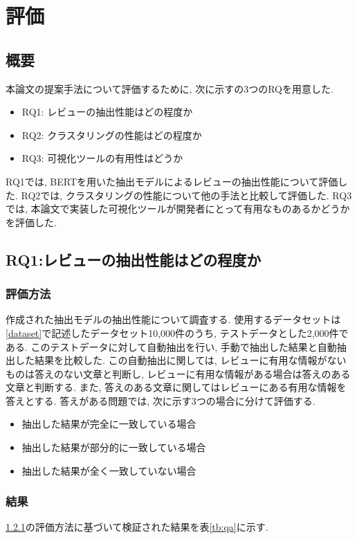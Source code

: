 \chapter{評価}
\label{chap:kekkahyouka}

\section{概要}
本論文の提案手法について評価するために, 次に示すの3つのRQを用意した. 

\begin{itemize}
  \item RQ1: レビューの抽出性能はどの程度か
  \item RQ2: クラスタリングの性能はどの程度か
  \item RQ3: 可視化ツールの有用性はどうか
\end{itemize}

RQ1では, BERTを用いた抽出モデルによるレビューの抽出性能について評価した. 
RQ2では, クラスタリングの性能について他の手法と比較して評価した. 
RQ3では, 本論文で実装した可視化ツールが開発者にとって有用なものあるかどうかを評価した. 

\section{RQ1:レビューの抽出性能はどの程度か}
\subsection{評価方法}\label{method}
作成された抽出モデルの抽出性能について調査する. 使用するデータセットは\ref{dataset}で記述したデータセット10,000件のうち, テストデータとした2,000件である. このテストデータに対して自動抽出を行い, 手動で抽出した結果と自動抽出した結果を比較した. 
この自動抽出に関しては, レビューに有用な情報がないものは答えのない文章と判断し, レビューに有用な情報がある場合は答えのある文章と判断する. また, 答えのある文章に関してはレビューにある有用な情報を答えとする. 
答えがある問題では, 次に示す3つの場合に分けて評価する. 

\begin{itemize}
  \item 抽出した結果が完全に一致している場合
  \item 抽出した結果が部分的に一致している場合
  \item 抽出した結果が全く一致していない場合
\end{itemize}

\subsection{結果}
\ref{method}の評価方法に基づいて検証された結果を表\ref{tb:qa}に示す. 

